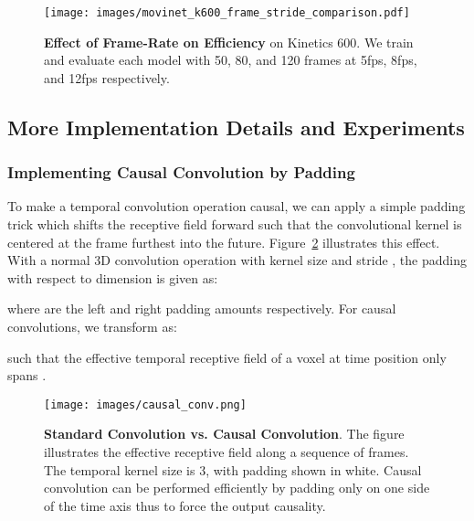 \documentclass[final]{cvpr}
\begin{document}
\begin{figure}[t]
    \begin{center}
    \texttt{[image: images/movinet\_k600\_frame\_stride\_comparison.pdf]}
    \end{center}
    \caption{
        {\bf Effect of Frame-Rate on Efficiency} on Kinetics 600.
        We train and evaluate each model with 50, 80, and 120 frames at 5fps, 8fps, and 12fps respectively.
    }
    \label{fig:frame-rate}
\end{figure}


\subsection{More Implementation Details and  Experiments}  \label{appendix:more-results}


\subsubsection{Implementing Causal Convolution by Padding}

To make a temporal convolution operation causal, we can apply a simple padding trick which shifts the receptive field forward such that the convolutional kernel is centered at the frame furthest into the future.
Figure~\ref{fig:causal-conv} illustrates this effect.
With a normal 3D convolution operation with kernel size  and stride , the padding with respect to dimension  is given as:

where  are the left and right padding amounts respectively.
For causal convolutions, we transform  as:

such that the effective temporal receptive field of a voxel at time position  only spans .


\begin{figure}[t]
    \begin{center}
    \texttt{[image: images/causal\_conv.png]}
    \end{center}
        \caption{
            {\bf Standard Convolution vs. Causal Convolution}. The figure illustrates the effective receptive field along a sequence of frames.
            The temporal kernel size is 3, with padding shown in white.
            Causal convolution can be performed efficiently by padding only on one side of the time axis thus to force the output causality.
}
    \label{fig:causal-conv}
\end{figure}
\end{document}
